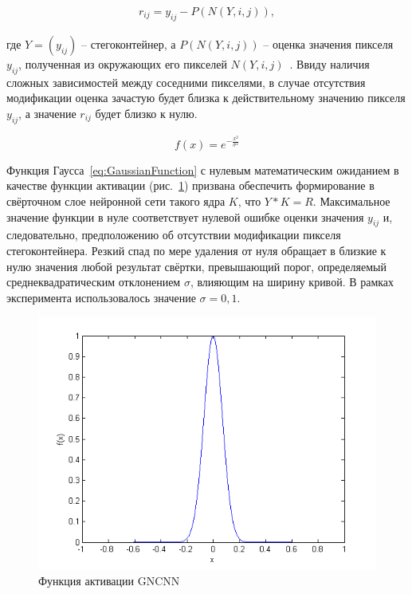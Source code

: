 \begin{align*}
r_{ij} = y_{ij} - P(N(Y, i, j)),
\end{align*}

где $ Y = (y_{ij}) $ – стегоконтейнер, а $ P(N(Y, i, j)) $ – оценка значения пикселя $ y_{ij} $, полученная из окружающих его пикселей $ N(Y, i, j) $~\cite{FridrichNoiseResidual}. Ввиду наличия сложных зависимостей между соседними пикселями, в случае отсутствия модификации оценка зачастую будет близка к действительному значению пикселя $ y_{ij} $, а значение $ r_{ij} $ будет близко к нулю.

\begin{equation}
\label{eq:GaussianFunction}
f(x) = e^{-\frac{x^2}{\sigma^2}}
\end{equation}

Функция Гаусса~\eqref{eq:GaussianFunction} с нулевым математическим ожиданием в качестве функции активации (рис.~\ref{fig:GaussianFunction}) призвана обеспечить формирование в свёрточном слое нейронной сети такого ядра $ K $, что $ Y*K = R $. Максимальное значение функции в нуле соответствует нулевой ошибке оценки значения $ y_{ij} $ и, следовательно, предположению об отсутствии модификации пикселя стегоконтейнера. Резкий спад по мере удаления от нуля обращает в близкие к нулю значения любой результат свёртки, превышающий порог, определяемый среднеквадратическим отклонением $ \sigma $, влияющим на ширину кривой. В рамках эксперимента использовалось значение $ \sigma = 0,1 $.

\begin{figure}
\centering
\includegraphics[width=1\textwidth]{include/graphics/im_2-gaussian_function}
\caption{Функция активации GNCNN}
\label{fig:GaussianFunction}
\end{figure}

